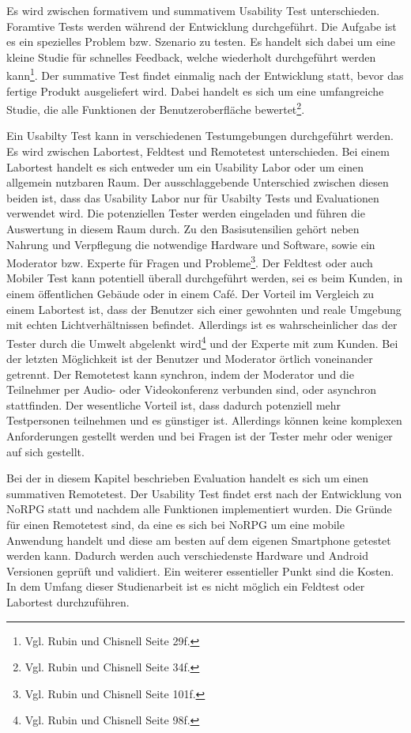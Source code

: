 		Es wird zwischen formativem und summativem Usability Test unterschieden. Foramtive Tests werden während der Entwicklung durchgeführt. Die Aufgabe ist es ein spezielles Problem bzw. Szenario zu testen. Es handelt sich dabei um eine kleine Studie für schnelles Feedback, welche wiederholt durchgeführt werden kann\footnote{Vgl. Rubin und Chisnell \cite{handbookUsability} Seite 29f.}. Der summative Test findet einmalig nach der Entwicklung statt, bevor das fertige Produkt ausgeliefert wird. Dabei handelt es sich um eine umfangreiche Studie, die alle Funktionen der Benutzeroberfläche bewertet\footnote{Vgl. Rubin und Chisnell \cite{handbookUsability} Seite 34f.}.
		
		Ein Usabilty Test kann in verschiedenen Testumgebungen durchgeführt werden. Es wird zwischen Labortest, Feldtest und Remotetest unterschieden. Bei einem Labortest handelt es sich entweder um ein Usability Labor oder um einen allgemein nutzbaren Raum. Der ausschlaggebende Unterschied zwischen diesen beiden ist, dass das Usability Labor nur für Usabilty Tests und Evaluationen verwendet wird. Die potenziellen Tester werden eingeladen und führen die Auswertung in diesem Raum durch. Zu den Basisutensilien gehört neben Nahrung und Verpflegung die notwendige Hardware und Software, sowie ein Moderator bzw. Experte für Fragen und Probleme\footnote{Vgl. Rubin und Chisnell \cite{handbookUsability} Seite 101f.}. Der Feldtest oder auch Mobiler Test kann potentiell überall durchgeführt werden, sei es beim Kunden, in einem öffentlichen Gebäude oder in einem Café. Der Vorteil im Vergleich zu einem Labortest ist, dass der Benutzer sich einer gewohnten und reale Umgebung mit echten Lichtverhältnissen befindet. Allerdings ist es wahrscheinlicher das der Tester durch die Umwelt abgelenkt wird\footnote{Vgl. Rubin und Chisnell \cite{handbookUsability} Seite 98f.} und der Experte mit zum Kunden. Bei der letzten Möglichkeit ist der Benutzer und Moderator örtlich voneinander getrennt. Der Remotetest kann synchron, indem der Moderator und die Teilnehmer per Audio- oder Videokonferenz verbunden sind, oder asynchron stattfinden. Der wesentliche Vorteil ist, dass dadurch potenziell mehr Testpersonen teilnehmen und es günstiger ist. Allerdings können keine komplexen Anforderungen gestellt werden und bei Fragen ist der Tester mehr oder weniger auf sich gestellt.
		
		Bei der in diesem Kapitel beschrieben Evaluation handelt es sich um einen summativen Remotetest. Der Usability Test findet erst nach der Entwicklung von NoRPG statt und nachdem alle Funktionen implementiert wurden. Die Gründe für einen Remotetest sind, da eine es sich bei NoRPG um eine mobile Anwendung handelt und diese am besten auf dem eigenen Smartphone getestet werden kann. Dadurch werden auch verschiedenste Hardware und Android Versionen geprüft und validiert. Ein weiterer essentieller Punkt sind die Kosten. In dem Umfang dieser Studienarbeit ist es nicht möglich ein Feldtest oder Labortest durchzuführen.
	
